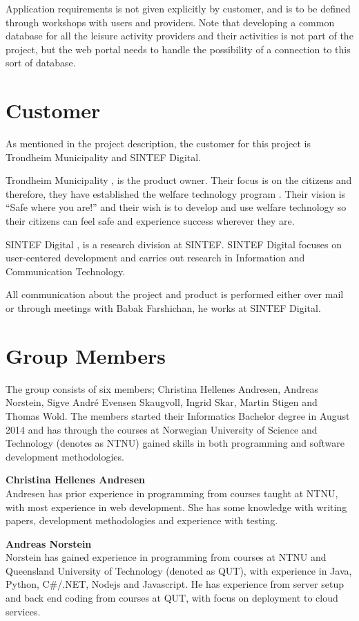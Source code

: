 Application requirements is not given explicitly by customer, and is to be defined through workshops with users and providers. Note that developing a common database for all the leisure activity providers and their activities is not part of the project, but the web portal needs to handle the possibility of a connection to this sort of database.  

\section{Customer}
As mentioned in the project description, the customer for this project is Trondheim Municipality and SINTEF Digital.

Trondheim Municipality \cite{TrondheimMunicipality}, is the product owner. Their focus is on the citizens and therefore, they have established the welfare technology program \cite{WelfareProgram}. Their vision is “Safe where you are!” and their wish is to develop and use welfare technology so their citizens can feel safe and experience success wherever they are.

SINTEF Digital \cite{SintefDigital}, is a research division at SINTEF. SINTEF Digital focuses on user-centered development and carries out research in Information and Communication Technology.

All communication about the project and product is performed either over mail or through meetings with Babak Farshichan, he works at SINTEF Digital.


\section{Group Members}
The group consists of six members; Christina Hellenes Andresen, Andreas Norstein, Sigve André Evensen Skaugvoll, Ingrid Skar, Martin Stigen and Thomas Wold. The members started their Informatics Bachelor degree in August 2014 and has through the courses at Norwegian University of Science and Technology (denotes as NTNU) gained skills in both programming and software development methodologies.

\textbf{Christina Hellenes Andresen}\\
Andresen has prior experience in programming from courses taught at NTNU, with most experience in web development. She has some knowledge with writing papers, development methodologies and experience with testing.

\textbf{Andreas Norstein} \\
Norstein has gained experience in programming from courses at NTNU and Queensland University of Technology (denoted as QUT), with experience in Java, Python, C\#/.NET, Nodejs and Javascript. He has experience from server setup and back end coding from courses at QUT, with focus on deployment to cloud services. 

